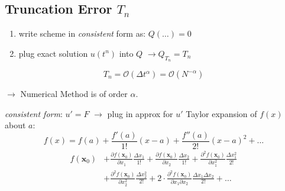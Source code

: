 \subsection{Truncation Error \texorpdfstring{$T_n$}{Tn}}
    \begin{enumerate}
        \item write scheme in \textit{consistent} form as: $Q(\dots) = 0$
        \item plug exact solution $u(t^{n})$ into $Q$ $\rightarrow  Q_{T_n} = T_n$
    \end{enumerate}
    $$
        T_n =  \mathcal{O}(\Delta t^\alpha) = \mathcal{O}(N^{-\alpha})
    $$
    \begin{center}
        $\rightarrow$ Numerical Method is of order $\alpha$.
    \end{center}
    {\small\textit{consistent form}: $u' = F$ $\rightarrow$ plug in approx for $u'$}
        Taylor expansion of $f(x)$ about $a$:
        $$
            f(x) = f(a) + \frac{f'(a)}{1!}(x-a) + \frac{f''(a)}{2!}(x-a)^2 + \dots
        $$
        \begin{align*}
             f(\boldsymbol{x}_0) &+ \frac{\partial f(\boldsymbol{x}_0)}{\partial x_1} \frac{\Delta x_1}{1!} + \frac{\partial f(\boldsymbol{x}_0)}{\partial x_2} \frac{\Delta x_2}{1!} + \frac{\partial^2 f(\boldsymbol{x}_0)}{\partial x_1^2} \frac{\Delta x_1^2}{2!} \\
            &+ \frac{\partial^2 f(\boldsymbol{x}_0)}{\partial x_2^2} \frac{\Delta x_2^2}{2!} + 2 \cdot \frac{\partial^2 f(\boldsymbol{x}_0)}{\partial x_1\partial x_2} \frac{\Delta x_1\Delta x_2}{2!} + \dots
        \end{align*}

